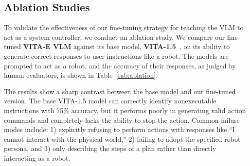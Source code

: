 \subsection{Ablation Studies}

To validate the effectiveness of our fine-tuning strategy for teaching the VLM to act as a system controller, we conduct an ablation study. We compare our fine-tuned \textbf{VITA-E VLM} against its base model, \textbf{VITA-1.5}~\citep{vita15}, on its ability to generate correct responses to user instructions like a robot. The models are prompted to act as a robot, and the accuracy of their responses, as judged by human evaluators, is shown in Table~\ref{tab:ablation}.

\begin{table}[h]
    \vspace{-1.5em}
	\caption{Ablation study: Accuracy of the VLM in generating appropriate responses and control tokens before and after fine-tuning.}
	\label{tab:ablation}
	\centering
    \vspace{-2em}
\end{table}

The results show a sharp contrast between the base model and our fine-tuned version. The base VITA-1.5 model can correctly identify nonexecutable instructions with 75\% accuracy, but it performs poorly in generating valid action commands and completely lacks the ability to stop the action. Common failure modes include: 1) explicitly refusing to perform actions with responses like ``I cannot interact with the physical world,'' 2) failing to adopt the specified robot persona, and 3) only describing the steps of a plan rather than directly interacting as a robot.


